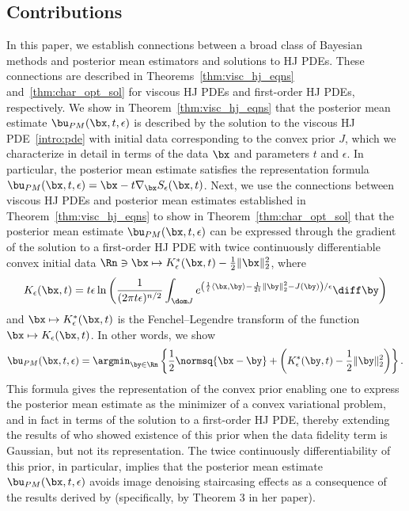 \subsection{Contributions} \label{subsec:intro_contributions}
In this paper, we establish connections between a broad class of Bayesian methods and posterior mean estimators and solutions to HJ PDEs. These connections are described in Theorems~\ref{thm:visc_hj_eqns} and~\ref{thm:char_opt_sol} for viscous HJ PDEs and first-order HJ PDEs, respectively. We show in Theorem~\ref{thm:visc_hj_eqns} that the posterior mean estimate $\bu_{PM}(\bx,t,\epsilon)$ is described by the solution to the viscous HJ PDE~\eqref{intro:pde} with initial data corresponding to the convex prior $J$, which we characterize in detail in terms of the data $\bx$ and parameters $t$ and $\epsilon$. In particular, the posterior mean estimate satisfies the representation formula $\bu_{PM}(\bx,t,\epsilon) = \bx - t\nabla_{\bx}S_\epsilon(\bx,t)$. Next, we use the connections between viscous HJ PDEs and posterior mean estimates established in Theorem~\ref{thm:visc_hj_eqns} to show in Theorem~\ref{thm:char_opt_sol} that the posterior mean estimate $\bu_{PM}(\bx,t,\epsilon)$ can be expressed through the gradient of the solution to a first-order HJ PDE with twice continuously differentiable convex initial data $\Rn \ni \bx \mapsto K^{*}_{\epsilon}(\bx,t)-\frac{1}{2}\Vert \bx \Vert_{2}^{2}$, where
\[
K_{\epsilon}(\bx,t) = t\epsilon\ln\left(\frac{1}{(2\pi t\epsilon)^{n/2}}\int_{\dom J}e^{\left(\frac{1}{t}\left\langle \bx,\by\right\rangle -\frac{1}{2t}\left\Vert \by\right\Vert _{2}^{2}-J(\by)\right)/\epsilon}\diff\by\right)
\]
and $\bx \mapsto  K^{*}_{\epsilon}(\bx,t)$ is the Fenchel--Legendre transform of the function $\bx \mapsto K_{\epsilon}(\bx,t)$. In other words, we show
\[
\bu_{PM}(\bx,t,\epsilon) = \argmin_{\by \in \Rn}\left\{\frac{1}{2}\normsq{\bx-\by} + \left( K^{*}_{\epsilon}(\by,t)-\frac{1}{2}\Vert \by \Vert_{2}^{2}\right)\right\}.
\]
This formula gives the representation of the convex prior enabling one to express the posterior mean estimate as the minimizer of a convex variational problem, and in fact in terms of the solution to a first-order HJ PDE, thereby extending the results of \cite{louchet2008modeles,gribonval2011should} who showed existence of this prior when the data fidelity term is Gaussian, but not its representation. The twice continuously differentiability of this prior, in particular, implies that the posterior mean estimate $\bu_{PM}(\bx,t,\epsilon)$ avoids image denoising staircasing effects as a consequence of the results derived by \citet{nikolova2004weakly} (specifically, by Theorem 3 in her paper).

